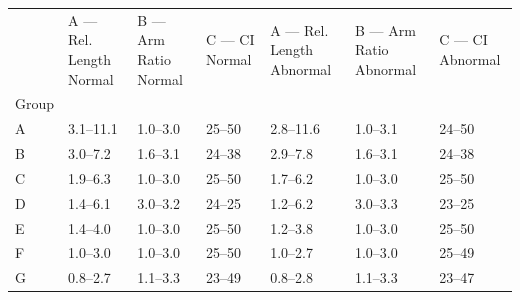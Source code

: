 \begin{tabular}{lllllll}
\toprule
 & A — Rel. Length Normal & B — Arm Ratio Normal & C — CI Normal & A — Rel. Length Abnormal & B — Arm Ratio Abnormal & C — CI Abnormal \\
Group &  &  &  &  &  &  \\
\midrule
A & 3.1–11.1 & 1.0–3.0 & 25–50 & 2.8–11.6 & 1.0–3.1 & 24–50 \\
B & 3.0–7.2 & 1.6–3.1 & 24–38 & 2.9–7.8 & 1.6–3.1 & 24–38 \\
C & 1.9–6.3 & 1.0–3.0 & 25–50 & 1.7–6.2 & 1.0–3.0 & 25–50 \\
D & 1.4–6.1 & 3.0–3.2 & 24–25 & 1.2–6.2 & 3.0–3.3 & 23–25 \\
E & 1.4–4.0 & 1.0–3.0 & 25–50 & 1.2–3.8 & 1.0–3.0 & 25–50 \\
F & 1.0–3.0 & 1.0–3.0 & 25–50 & 1.0–2.7 & 1.0–3.0 & 25–49 \\
G & 0.8–2.7 & 1.1–3.3 & 23–49 & 0.8–2.8 & 1.1–3.3 & 23–47 \\
\bottomrule
\end{tabular}
